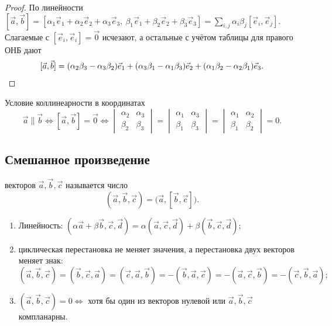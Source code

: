 \documentclass[11pt,a4paper]{article}
\begin{document}
\begin{proof}
По линейности $[\vec a,\vec b]=[\alpha_1\vec e_1+\alpha_2\vec e_2+\alpha_3\vec e_3,\ \beta_1\vec e_1+\beta_2\vec e_2+\beta_3\vec e_3]
=\sum\limits_{i,j}\alpha_i\beta_j[\vec e_i,\vec e_j]$. Слагаемые с $[\vec e_i,\vec e_i]=\vec 0$ исчезают, а остальные с учётом
таблицы для правого ОНБ дают
\[
[\vec a,\vec b]=(\alpha_2\beta_3-\alpha_3\beta_2)\vec e_1+(\alpha_3\beta_1-\alpha_1\beta_3)\vec e_2+(\alpha_1\beta_2-\alpha_2\beta_1)\vec e_3.\qedhere
\]
\end{proof}

\begin{fbx}{Условие коллинеарности в координатах}
\[
\vec a\parallel\vec b\iff[\vec a,\vec b]=\vec 0\iff
\begin{vmatrix}\alpha_2&\alpha_3\\ \beta_2&\beta_3\end{vmatrix}=
\begin{vmatrix}\alpha_1&\alpha_3\\ \beta_1&\beta_3\end{vmatrix}=
\begin{vmatrix}\alpha_1&\alpha_2\\ \beta_1&\beta_2\end{vmatrix}=0.
\]
\end{fbx}

\subsection{Смешанное произведение}

\begin{opr}
 векторов $\vec a,\vec b,\vec c$ называется число
\[
(\vec a,\vec b,\vec c)=\bigl(\vec a,[\vec b,\vec c]\bigr).
\]
\end{opr}

\begin{svv}
\begin{enumerate}
\item Линейность: $(\alpha\vec a+\beta\vec b,\vec c,\vec d)=\alpha(\vec a,\vec c,\vec d)+\beta(\vec b,\vec c,\vec d)$;
\item циклическая перестановка не меняет значения, а перестановка двух векторов меняет знак:
\[
(\vec a,\vec b,\vec c)=(\vec b,\vec c,\vec a)=(\vec c,\vec a,\vec b)=-(\vec b,\vec a,\vec c)=-(\vec a,\vec c,\vec b)=-(\vec c,\vec b,\vec a);
\]
\item $(\vec a,\vec b,\vec c)=0\iff$ хотя бы один из векторов нулевой или $\vec a,\vec b,\vec c$ компланарны.
\end{enumerate}
\end{svv}
\end{document}
